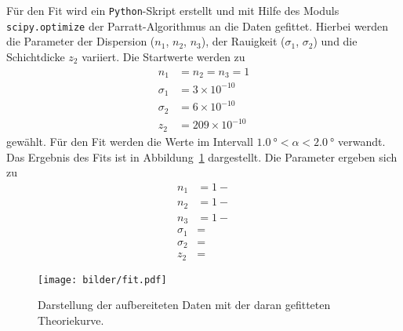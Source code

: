 Für den Fit wird ein \texttt{Python}-Skript erstellt und mit Hilfe des Moduls
\texttt{scipy.optimize} der Parratt-Algorithmus an die Daten gefittet.
Hierbei werden die Parameter der Dispersion ($n_1$, $n_2$, $n_3$),
der Rauigkeit ($\sigma_1$, $\sigma_2$) und die Schichtdicke $z_2$ variiert.
Die Startwerte werden zu
\begin{align*}
  n_1      &= n_2 = n_3 = 1 \\
  \sigma_1 &= 3 \times 10^{-10} \\
  \sigma_2 &= 6 \times 10^{-10} \\
  z_2      &= 209 \times 10^{-10}
\end{align*}
gewählt.
Für den Fit werden die Werte im Intervall
$\SI{1.0}{\degree} < \alpha < \SI{2.0}{\degree}$ verwandt.
Das Ergebnis des Fits ist in Abbildung~\ref{fig:fit} dargestellt.
Die Parameter ergeben sich zu
\begin{align*}
  n_1      &= 1 -  \\
  n_2      &= 1 -  \\
  n_3      &= 1 -  \\
  \sigma_1 &=  \\
  \sigma_2 &=  \\
  z_2      &= 
\end{align*}

\begin{figure}[htpb]
  \centering
  \texttt{[image: bilder/fit.pdf]}
  \caption{Darstellung der aufbereiteten Daten mit der daran gefitteten
  Theoriekurve.}
\label{fig:fit}
\end{figure}

